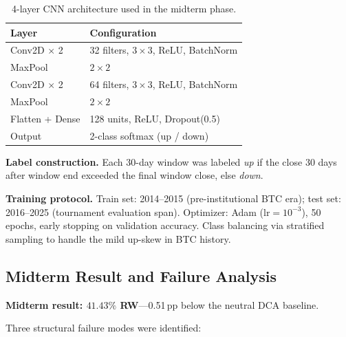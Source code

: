 \documentclass[11pt,letterpaper]{article}
\begin{document}
\begin{table}[H]
  \centering
  \caption{4-layer CNN architecture used in the midterm phase.}
  \label{tab:cnn_arch}
  \begin{tabular}{ll}
    \toprule
    \textbf{Layer} & \textbf{Configuration} \\
    \midrule
    Conv2D $\times$ 2 & 32 filters, $3{\times}3$, ReLU, BatchNorm \\
    MaxPool           & $2{\times}2$ \\
    Conv2D $\times$ 2 & 64 filters, $3{\times}3$, ReLU, BatchNorm \\
    MaxPool           & $2{\times}2$ \\
    Flatten + Dense   & 128 units, ReLU, Dropout(0.5) \\
    Output            & 2-class softmax (up / down) \\
    \bottomrule
  \end{tabular}
\end{table}

\textbf{Label construction.}  Each 30-day window was labeled \emph{up} if the
close 30 days after window end exceeded the final window close, else \emph{down}.

\textbf{Training protocol.}  Train set: 2014--2015 (pre-institutional BTC era);
test set: 2016--2025 (tournament evaluation span).  Optimizer: Adam
($\text{lr}=10^{-3}$), 50 epochs, early stopping on validation accuracy.  Class
balancing via stratified sampling to handle the mild up-skew in BTC history.

\subsection{Midterm Result and Failure Analysis}

\textbf{Midterm result: $41.43\%$ RW}---0.51\,pp below the neutral DCA baseline.

Three structural failure modes were identified:
\end{document}
